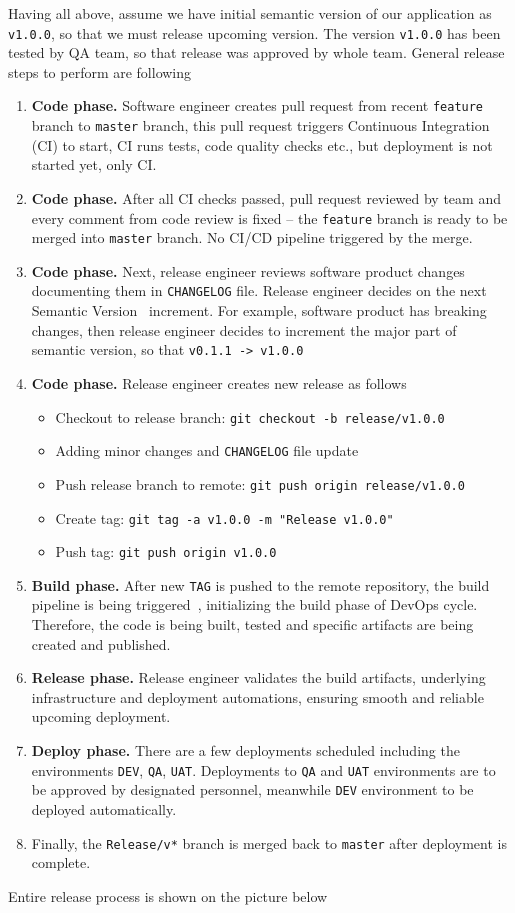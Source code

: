 ﻿Having all above, assume we have initial semantic version of our application as \texttt{v1.0.0},
so that we must release upcoming version.
The version \texttt{v1.0.0} has been tested by QA team, so that release was approved by whole team.
General release steps to perform are following
\begin{enumerate}
    \item \textbf{Code phase.}
    Software engineer creates pull request from recent \texttt{feature} branch to \texttt{master} branch,
    this pull request triggers Continuous Integration (CI) to start, CI runs tests, code quality checks etc.,
    but deployment is not started yet, only CI\@.
    \item \textbf{Code phase.}
    After all CI checks passed, pull request reviewed by team and every comment from code review is fixed --
    the \texttt{feature} branch is ready to be merged into \texttt{master} branch.
    No CI/CD pipeline triggered by the merge.
    \item \textbf{Code phase.}
    Next, release engineer reviews software product changes documenting them in \texttt{CHANGELOG} file.
    Release engineer decides on the next Semantic Version~\cite{SemanticVersioning} increment.
    For example, software product has breaking changes,
    then release engineer decides to increment the major part of semantic version, so that \texttt{v0.1.1 -> v1.0.0}
    \item \textbf{Code phase.}
    Release engineer creates new release as follows
    \begin{itemize}
        \item Checkout to release branch: \texttt{git checkout -b release/v1.0.0}
        \item Adding minor changes and \texttt{CHANGELOG} file update
        \item Push release branch to remote: \texttt{git push origin release/v1.0.0}
        \item Create tag: \texttt{git tag -a v1.0.0 -m "Release v1.0.0"}
        \item Push tag: \texttt{git push origin v1.0.0}
    \end{itemize}
    \item \textbf{Build phase.}
    After new \texttt{TAG} is pushed to the remote repository, the build pipeline is being triggered~\cite{AzurePipelinesTriggers},
    initializing the build phase of DevOps cycle.
    Therefore, the code is being built, tested and specific artifacts are being created and published.
    \item \textbf{Release phase.} Release engineer validates the build artifacts,
    underlying infrastructure and deployment automations, ensuring smooth and reliable upcoming deployment.
    \item \textbf{Deploy phase.}
    There are a few deployments scheduled including the environments \texttt{DEV}, \texttt{QA}, \texttt{UAT}.
    Deployments to \texttt{QA} and \texttt{UAT} environments are to be approved by designated personnel,
    meanwhile \texttt{DEV} environment to be deployed automatically.
    \item Finally, the \texttt{Release/v*} branch is merged back to \texttt{master} after deployment is complete.
\end{enumerate}
Entire release process is shown on the picture below

